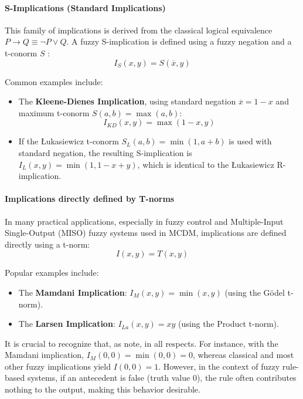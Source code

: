 \paragraph{S-Implications (Standard Implications)}
This family of implications is derived from the classical logical equivalence $P \rightarrow Q \equiv \neg P \lor Q$. A fuzzy S-implication is defined using a fuzzy negation and a t-conorm $S$ \cite[p.59]{FULLER2}:
\[I_S(x,y) = S(\overline{x}, y)\]
\begin{example}[S-Implications]
Common examples include:
\begin{itemize}
    \item The \textbf{Kleene-Dienes Implication}, using standard negation $\overline{x}=1-x$ and maximum t-conorm $S(a,b)=\max(a,b)$:
    \[I_{KD}(x,y) = \max(1-x, y)\]
    \item If the Łukasiewicz t-conorm $S_L(a,b) = \min(1, a+b)$ is used with standard negation, the resulting S-implication is $I_L(x,y) = \min(1, 1-x+y)$, which is identical to the Łukasiewicz R-implication.
\end{itemize}
\end{example}

\paragraph{Implications directly defined by T-norms}
In many practical applications, especially in fuzzy control and Multiple-Input Single-Output (MISO) fuzzy systems used in MCDM, implications are defined directly using a t-norm:
\[I(x,y) = T(x,y)\]
\begin{example}
Popular examples include:
\begin{itemize}
    \item The \textbf{Mamdani Implication}: $I_M(x,y) = \min(x,y)$ (using the Gödel t-norm).
    \item The \textbf{Larsen Implication}: $I_{La}(x,y) = xy$ (using the Product t-norm).
\end{itemize}
\end{example}
It is crucial to recognize that, as \cite[p.60]{FULLER2} note,  in all respects. For instance, with the Mamdani implication, $I_M(0,0) = \min(0,0) = 0$, whereas classical and most other fuzzy implications yield $I(0,0)=1$. However, in the context of fuzzy rule-based systems, if an antecedent is false (truth value 0), the rule often contributes nothing to the output, making this behavior desirable.

